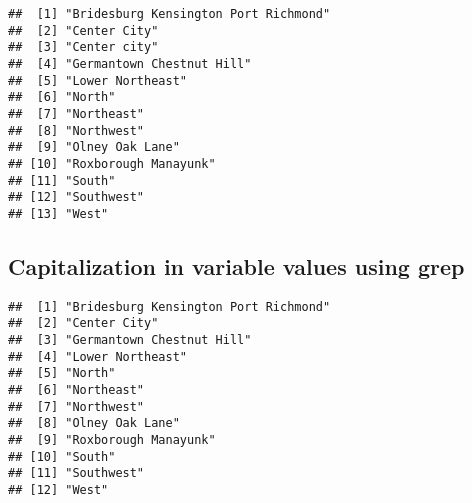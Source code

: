\documentclass[]{article}
\newenvironment{Shaded}{\begin{snugshade}}{\end{snugshade}}
\newcommand{\KeywordTok}[1]{\textcolor[rgb]{0.13,0.29,0.53}{\textbf{#1}}}
\newcommand{\DataTypeTok}[1]{\textcolor[rgb]{0.13,0.29,0.53}{#1}}
\newcommand{\StringTok}[1]{\textcolor[rgb]{0.31,0.60,0.02}{#1}}
\newcommand{\CommentTok}[1]{\textcolor[rgb]{0.56,0.35,0.01}{\textit{#1}}}
\newcommand{\OtherTok}[1]{\textcolor[rgb]{0.56,0.35,0.01}{#1}}
\newcommand{\OperatorTok}[1]{\textcolor[rgb]{0.81,0.36,0.00}{\textbf{#1}}}
\newcommand{\NormalTok}[1]{#1}
\begin{document}
\begin{Shaded}
\end{Shaded}

\begin{verbatim}
##  [1] "Bridesburg Kensington Port Richmond"
##  [2] "Center City"                        
##  [3] "Center city"                        
##  [4] "Germantown Chestnut Hill"           
##  [5] "Lower Northeast"                    
##  [6] "North"                              
##  [7] "Northeast"                          
##  [8] "Northwest"                          
##  [9] "Olney Oak Lane"                     
## [10] "Roxborough Manayunk"                
## [11] "South"                              
## [12] "Southwest"                          
## [13] "West"
\end{verbatim}

\subsection{Capitalization in variable values using
grep}\label{capitalization-in-variable-values-using-grep}

\begin{Shaded}
\end{Shaded}

\begin{Shaded}
\end{Shaded}

\begin{Shaded}
\end{Shaded}

\begin{verbatim}
##  [1] "Bridesburg Kensington Port Richmond"
##  [2] "Center City"                        
##  [3] "Germantown Chestnut Hill"           
##  [4] "Lower Northeast"                    
##  [5] "North"                              
##  [6] "Northeast"                          
##  [7] "Northwest"                          
##  [8] "Olney Oak Lane"                     
##  [9] "Roxborough Manayunk"                
## [10] "South"                              
## [11] "Southwest"                          
## [12] "West"
\end{verbatim}
\end{document}
